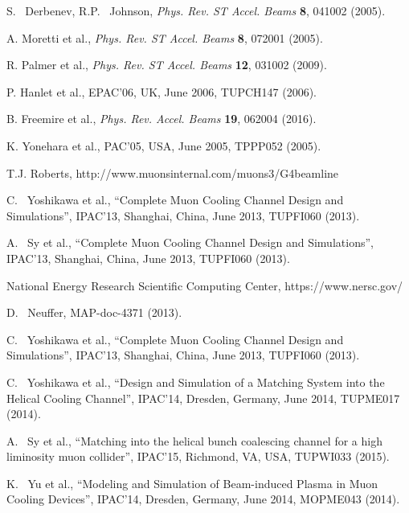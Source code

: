 \documentclass[11pt]{article}
\begin{document}
\begin{thebibliography}{99}

    S. ~Derbenev, R.P. ~Johnson,
    \emph{Phys. Rev. ST Accel. Beams} \textbf{8}, 041002 (2005).

    A. Moretti et al.,
    \emph{Phys. Rev. ST Accel. Beams} \textbf{8}, 072001 (2005).

    R. Palmer et al., 
    \emph{Phys. Rev. ST Accel. Beams} \textbf{12}, 031002 (2009).

    P. Hanlet et al.,
    EPAC'06, UK, June 2006, TUPCH147 (2006). 

    B. Freemire et al.,
    \emph{Phys. Rev. Accel. Beams} \textbf{19}, 062004 (2016).

    K. Yonehara et al.,
    PAC'05, USA, June 2005, TPPP052 (2005).

    T.J. Roberts, 
    http://www.muonsinternal.com/muons3/G4beamline

    C. ~Yoshikawa et al., ``Complete Muon Cooling Channel Design and Simulations'',
    IPAC'13, Shanghai, China,
    June 2013, TUPFI060 (2013).

    A. ~Sy et al., ``Complete Muon Cooling Channel Design and Simulations'',
    IPAC'13, Shanghai, China,
    June 2013, TUPFI060 (2013).

    National Energy Research Scientific Computing Center,
    https://www.nersc.gov/

	D. ~Neuffer, MAP-doc-4371 (2013).

    C. ~Yoshikawa et al., ``Complete Muon Cooling Channel Design and Simulations'',
    IPAC'13, Shanghai, China,
    June 2013, TUPFI060 (2013).

    C. ~Yoshikawa et al., ``Design and Simulation of a Matching System into the Helical Cooling Channel'',
    IPAC'14, Dresden, Germany,
    June 2014, TUPME017 (2014).

  A. ~Sy et al., ``Matching into the helical bunch coalescing channel for a
  high liminosity muon collider'',
    IPAC'15, Richmond, VA, USA,
    TUPWI033 (2015).

    K. ~Yu et al., ``Modeling and Simulation of Beam-induced Plasma in Muon Cooling Devices'',
    IPAC'14, Dresden, Germany,
    June 2014, MOPME043 (2014).
    

\end{thebibliography}
\end{document}
